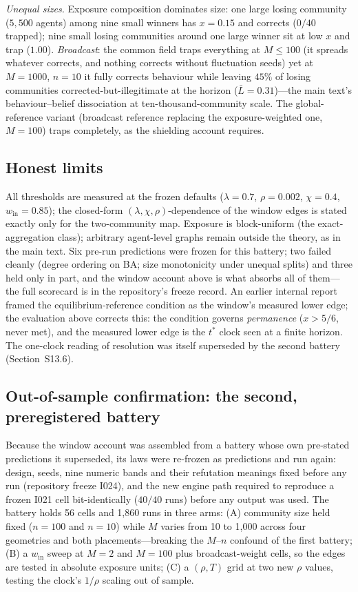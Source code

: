 \documentclass[11pt]{article}
\newcommand{\1}{\mathbf{1}}
\begin{document}
\emph{Unequal sizes.} Exposure composition dominates size: one large losing community ($5{,}500$ agents) among nine small winners has $x=0.15$ and corrects ($0/40$ trapped); nine small losing communities around one large winner sit at low $x$ and trap ($1.00$). \emph{Broadcast}: the common field traps everything at $M\le100$ (it spreads whatever corrects, and nothing corrects without fluctuation seeds) yet at $M=1000$, $n=10$ it fully corrects behaviour while leaving $45\%$ of losing communities corrected-but-illegitimate at the horizon ($\bar L=0.31$)---the main text's behaviour--belief dissociation at ten-thousand-community scale. The global-reference variant (broadcast reference replacing the exposure-weighted one, $M=100$) traps completely, as the shielding account requires.

\subsection{Honest limits}
All thresholds are measured at the frozen defaults ($\lambda=0.7$, $\rho=0.002$, $\chi=0.4$, $w_{\mathrm{in}}=0.85$); the closed-form $(\lambda,\chi,\rho)$-dependence of the window edges is stated exactly only for the two-community map. Exposure is block-uniform (the exact-aggregation class); arbitrary agent-level graphs remain outside the theory, as in the main text. Six pre-run predictions were frozen for this battery; two failed cleanly (degree ordering on BA; size monotonicity under unequal splits) and three held only in part, and the window account above is what absorbs all of them---the full scorecard is in the repository's freeze record. An earlier internal report framed the equilibrium-reference condition as the window's measured lower edge; the evaluation above corrects this: the condition governs \emph{permanence} ($x>5/6$, never met), and the measured lower edge is the $t^{*}$ clock seen at a finite horizon. The one-clock reading of resolution was itself superseded by the second battery (Section~S13.6).

\subsection{Out-of-sample confirmation: the second, preregistered battery}
Because the window account was assembled from a battery whose own pre-stated
predictions it superseded, its laws were re-frozen as predictions and run again:
design, seeds, nine numeric bands and their refutation meanings fixed before any
run (repository freeze I024), and the new engine path required to reproduce a
frozen I021 cell bit-identically ($40/40$ runs) before any output was used. The
battery holds 56 cells and 1,860 runs in three arms: (A) community size held
fixed ($n=100$ and $n=10$) while $M$ varies from 10 to 1{,}000 across four
geometries and both placements---breaking the $M$--$n$ confound of the first
battery; (B) a $w_{\mathrm{in}}$ sweep at $M=2$ and $M=100$ plus
broadcast-weight cells, so the edges are tested in absolute exposure units; (C)
a $(\rho,T)$ grid at two new $\rho$ values, testing the clock's $1/\rho$
scaling out of sample.
\end{document}
